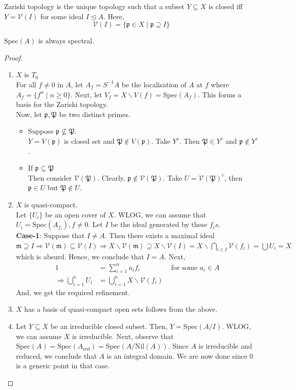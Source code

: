\documentclass[oneside, 12pt, ]{scrbook}
\newcommand{\V}{\mathcal{V}}
\newcommand{\spec}{\mathrm{Spec}}
\newcommand{\pr}{\mathfrak{p}}
\newcommand{\m}{\mathfrak{m}}
\newcommand{\nil}{\mathrm{Nil}}
\theoremstyle{theorem}
\begin{document}
Zariski topology is the unique topology such that a subset $Y\subseteq X$ is closed iff $Y = \V (I)$ for some ideal $I \unlhd A$. Here, $$\V(I) = \{\pr \in X \mid \pr \supseteq I\}$$

\begin{theorem}
$\spec(A)$ is always spectral.
\end{theorem}

\begin{proof}
\begin{enumerate}
\item $X$ is $T_{0}$ \\
For all $f \neq 0$ in $A$,  let $A_{f} = S^{-1}A$ be the localisation of $A$ at $f$ where $A_{f} = \{f^n \mid n \geq 0\}$. Next, let $V_{f} = X \backslash V(f) = \spec (A_{f})$. This forms a basis for the Zariski topology. \\
Now, let $\pr, \mathfrak{P}$ be two distinct primes. 
\begin{itemize}
\item Suppose $\pr \not \subseteq \mathfrak{P}$. \\
$Y = V(\pr)$ is closed set and $\mathfrak{P} \not \in V(\pr)$. Take $Y^c$. Then $\mathfrak{P} \in Y^c$ and $\pr \not \in Y^c$. 
\item If $\pr \subseteq \mathfrak{P}$ \\
Then consider $\V(\mathfrak{P})$. Clearly, $\pr \not \in \V(\mathfrak{P})$. Take $U = \V(\mathfrak{P})^c$, then $\pr \in U$ but $\mathfrak{P} \not\in U$. 
\end{itemize}
\item $X$ is quasi-compact. \\
Let $\{U_{i}\}$ be an open cover of $X$. WLOG, we can assume that $U_{i} = \spec(A_{f_{i}}), f \neq 0$. Let $I$ be the ideal generated by these $f_{i}s$. \\
\textbf{Case-1}: Suppose that $I \neq A$. Then there exists a maximal ideal $\m \supseteq I \Rightarrow \V(\m) \subseteq \V(I) \Rightarrow X \backslash \V(\m) \supseteq X\backslash \V(I) = X \backslash \bigcap_{i \in I}\V(f_{i}) = \bigcup U_{i} = X$ which is absurd. Hence, we conclude that $I=A$. Next, 
\begin{align*}
1 &= \sum_{i=1}^n a_{i}f_{i} &\text{ for some } a_{i} \in A \\
\Rightarrow \bigcup_{i=1}^n U_{i} &= \bigcup_{i=1}^n X \backslash \V(f_{i})
\end{align*}
And, we get the required refinement. 
\item $X$ has a basis of quasi-compact open sets follows from the above.
\item Let $Y \subseteq X$ be an irreducible closed subset. Then, $Y = \spec(A/I)$. WLOG, we can assume $X$ is irreducible. Next, observe that $\spec(A) = \spec(A_{\mathrm{red}}) = \spec(A/ \nil(A))$. Since $A$ is irreducible and reduced, we conclude that $A$ is an integral domain. We are now done since $0$ is a generic point in that case.
\end{enumerate}
\end{proof}
\end{document}
